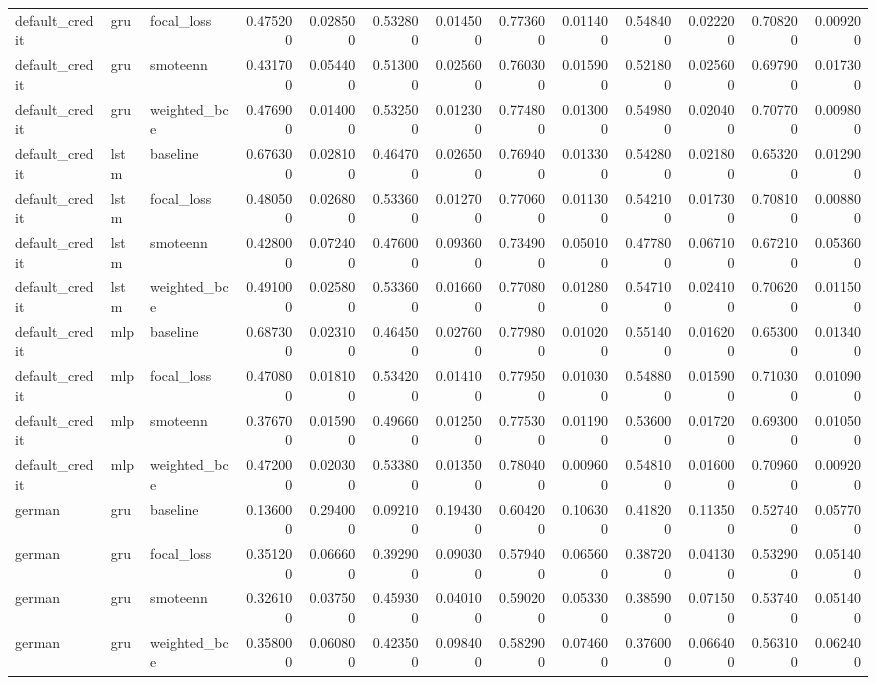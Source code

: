 \begin{tabular}{lllrrrrrrrrrr}
default_credit & gru & focal_loss & 0.475200 & 0.028500 & 0.532800 & 0.014500 & 0.773600 & 0.011400 & 0.548400 & 0.022200 & 0.708200 & 0.009200 \\
default_credit & gru & smoteenn & 0.431700 & 0.054400 & 0.513000 & 0.025600 & 0.760300 & 0.015900 & 0.521800 & 0.025600 & 0.697900 & 0.017300 \\
default_credit & gru & weighted_bce & 0.476900 & 0.014000 & 0.532500 & 0.012300 & 0.774800 & 0.013000 & 0.549800 & 0.020400 & 0.707700 & 0.009800 \\
default_credit & lstm & baseline & 0.676300 & 0.028100 & 0.464700 & 0.026500 & 0.769400 & 0.013300 & 0.542800 & 0.021800 & 0.653200 & 0.012900 \\
default_credit & lstm & focal_loss & 0.480500 & 0.026800 & 0.533600 & 0.012700 & 0.770600 & 0.011300 & 0.542100 & 0.017300 & 0.708100 & 0.008800 \\
default_credit & lstm & smoteenn & 0.428000 & 0.072400 & 0.476000 & 0.093600 & 0.734900 & 0.050100 & 0.477800 & 0.067100 & 0.672100 & 0.053600 \\
default_credit & lstm & weighted_bce & 0.491000 & 0.025800 & 0.533600 & 0.016600 & 0.770800 & 0.012800 & 0.547100 & 0.024100 & 0.706200 & 0.011500 \\
default_credit & mlp & baseline & 0.687300 & 0.023100 & 0.464500 & 0.027600 & 0.779800 & 0.010200 & 0.551400 & 0.016200 & 0.653000 & 0.013400 \\
default_credit & mlp & focal_loss & 0.470800 & 0.018100 & 0.534200 & 0.014100 & 0.779500 & 0.010300 & 0.548800 & 0.015900 & 0.710300 & 0.010900 \\
default_credit & mlp & smoteenn & 0.376700 & 0.015900 & 0.496600 & 0.012500 & 0.775300 & 0.011900 & 0.536000 & 0.017200 & 0.693000 & 0.010500 \\
default_credit & mlp & weighted_bce & 0.472000 & 0.020300 & 0.533800 & 0.013500 & 0.780400 & 0.009600 & 0.548100 & 0.016000 & 0.709600 & 0.009200 \\
german & gru & baseline & 0.136000 & 0.294000 & 0.092100 & 0.194300 & 0.604200 & 0.106300 & 0.418200 & 0.113500 & 0.527400 & 0.057700 \\
german & gru & focal_loss & 0.351200 & 0.066600 & 0.392900 & 0.090300 & 0.579400 & 0.065600 & 0.387200 & 0.041300 & 0.532900 & 0.051400 \\
german & gru & smoteenn & 0.326100 & 0.037500 & 0.459300 & 0.040100 & 0.590200 & 0.053300 & 0.385900 & 0.071500 & 0.537400 & 0.051400 \\
german & gru & weighted_bce & 0.358000 & 0.060800 & 0.423500 & 0.098400 & 0.582900 & 0.074600 & 0.376000 & 0.066400 & 0.563100 & 0.062400 \\

\end{tabular}
